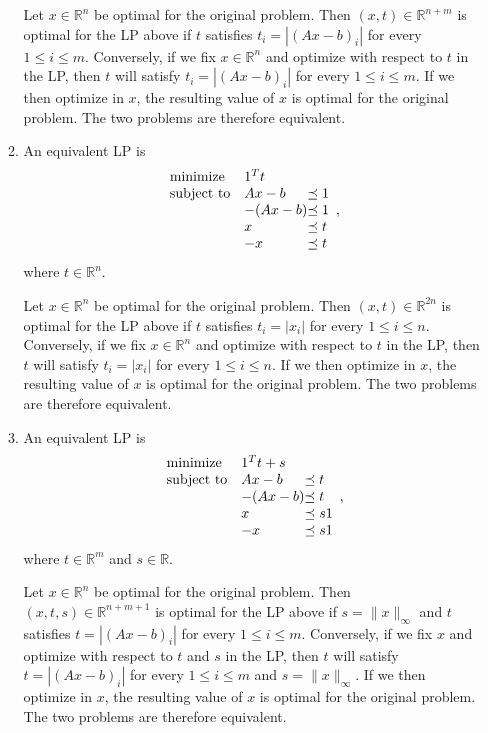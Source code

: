 \documentclass[letterpaper,12pt]{article}
\begin{document}
\begin{enumerate}
\begin{enumerate}
  Let $x \in \mathbb{R}^n$ be optimal for the original problem. Then
  $(x, t) \in \mathbb{R}^{n+m}$ is optimal for the LP above if $t$
  satisfies $t_i = |(Ax - b)_i|$ for every $1 \leq i \leq
  m$. Conversely, if we fix $x \in \mathbb{R}^n$ and optimize with
  respect to $t$ in the LP, then $t$ will satisfy $t_i = |(Ax - b)_i|$
  for every $1 \leq i \leq m$. If we then optimize in $x$, the
  resulting value of $x$ is optimal for the original problem. The two
  problems are therefore equivalent.

\item An equivalent LP is
  \begin{equation*}
    \begin{array}{ll@{}ll}
      \text{minimize} & 1^T t \\
      \text{subject to}
        & Ax - b &\preceq 1 \\
        &-(Ax - b) &\preceq 1 \\
        &x &\preceq t \\
        &-x &\preceq t
    \end{array},
  \end{equation*}
  where $t \in \mathbb{R}^n$.

  Let $x \in \mathbb{R}^n$ be optimal for the original problem. Then
  $(x, t) \in \mathbb{R}^{2n}$ is optimal for the LP above if $t$
  satisfies $t_i = |x_i|$ for every $1 \leq i \leq n$. Conversely, if
  we fix $x \in \mathbb{R}^n$ and optimize with respect to $t$ in the
  LP, then $t$ will satisfy $t_i = |x_i|$ for every $1 \leq i \leq
  n$. If we then optimize in $x$, the resulting value of $x$ is
  optimal for the original problem. The two problems are therefore
  equivalent.

\item An equivalent LP is
  \begin{equation*}
    \begin{array}{ll@{}ll}
      \text{minimize} & 1^T t + s \\
      \text{subject to}
        & Ax - b &\preceq t \\
        &-(Ax - b) &\preceq t \\
        &x &\preceq s1 \\
        &-x &\preceq s1
    \end{array},
  \end{equation*}
  where $t \in \mathbb{R}^m$ and $s \in \mathbb{R}$.

  Let $x \in \mathbb{R}^n$ be optimal for the original problem. Then
  $(x, t, s) \in \mathbb{R}^{n+m+1}$ is optimal for the LP above if
  $s = \lVert x \rVert_\infty$ and $t$ satisfies $t = |(Ax - b)_i|$
  for every $1 \leq i \leq m$. Conversely, if we fix $x$ and optimize
  with respect to $t$ and $s$ in the LP, then $t$ will satisfy
  $t = |(Ax - b)_i|$ for every $1 \leq i \leq m$ and
  $s = \lVert x \rVert_\infty$. If we then optimize in $x$, the
  resulting value of $x$ is optimal for the original problem. The two
  problems are therefore equivalent.


\end{enumerate}
\end{enumerate}
\end{document}

